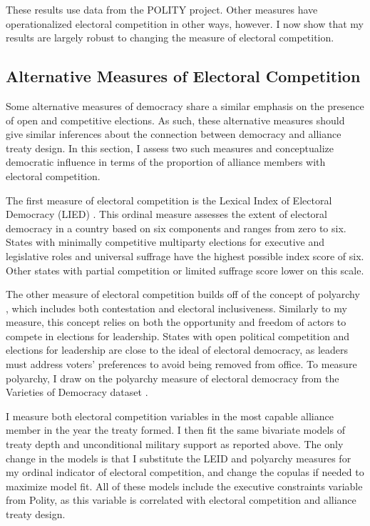 \documentclass[12pt]{article}
\begin{document}
These results use data from the POLITY project. 
Other measures have operationalized electoral competition in other ways, however. 
I now show that my results are largely robust to changing the measure of electoral competition. 


\subsection{Alternative Measures of Electoral Competition}


Some alternative measures of democracy share a similar emphasis on the presence of open and competitive elections. 
As such, these alternative measures should give similar inferences about the connection between democracy and alliance treaty design. 
In this section, I assess two such measures and conceptualize democratic influence in terms of the proportion of alliance members with electoral competition. 


The first measure of electoral competition is the Lexical Index of Electoral Democracy (LIED) \citep{Skaaningetal2015}. 
This ordinal measure assesses the extent of electoral democracy in a country based on six components and ranges from zero to six.  
States with minimally competitive multiparty elections for executive and legislative roles and universal suffrage have the highest possible index score of six.
Other states with partial competition or limited suffrage score lower on this scale. 


The other measure of electoral competition builds off of the concept of polyarchy \citep{Dahl1971}, which includes both contestation and electoral inclusiveness. 
Similarly to my measure, this concept relies on both the opportunity and freedom of actors to compete in elections for leadership. 
States with open political competition and elections for leadership are close to the ideal of electoral democracy, as leaders must address voters' preferences to avoid being removed from office. 
To measure polyarchy, I draw on the polyarchy measure of electoral democracy from the Varieties of Democracy dataset \citep{Teorelletal2016}.


I measure both electoral competition variables in the most capable alliance member in the year the treaty formed. 
I then fit the same bivariate models of treaty depth and unconditional military support as reported above. 
The only change in the models is that I substitute the LEID and polyarchy measures for my ordinal indicator of electoral competition, and change the copulas if needed to maximize model fit.
All of these models include the executive constraints variable from Polity, as this variable is correlated with electoral competition and alliance treaty design. 
\end{document}

